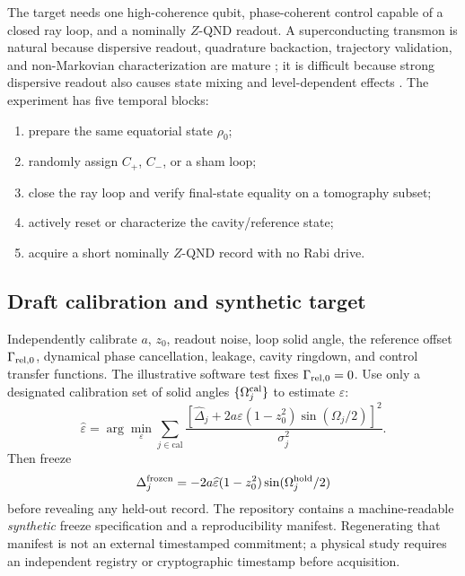 \documentclass[10pt]{article}
\theoremstyle{definition}
\theoremstyle{remark}
\begin{document}
The target needs one high-coherence qubit, phase-coherent control capable of a closed ray loop, and a nominally \(Z\)-QND readout. A superconducting transmon is natural because dispersive readout, quadrature backaction, trajectory validation, and non-Markovian characterization are mature \citep{Gambetta2008,Hatridge2013,Murch2013,White2022}; it is difficult because strong dispersive readout also causes state mixing and level-dependent effects \citep{Boissonneault2009}. The experiment has five temporal blocks:
\begin{enumerate}
\item prepare the same equatorial state \(\rho_0\);
\item randomly assign \(C_+\), \(C_-\), or a sham loop;
\item close the ray loop and verify final-state equality on a tomography subset;
\item actively reset or characterize the cavity/reference state;
\item acquire a short nominally \(Z\)-QND record with no Rabi drive.
\end{enumerate}

\subsection{Draft calibration and synthetic target}

Independently calibrate \(a\), \(z_0\), readout noise, loop solid angle, the reference offset \(\Gamma_{{\rm rel},0}\), dynamical phase cancellation, leakage, cavity ringdown, and control transfer functions. The illustrative software test fixes \(\Gamma_{{\rm rel},0}=0\). Use only a designated calibration set of solid angles \(\{\Omega_j^{\rm cal}\}\) to estimate \(\varepsilon\):
\begin{equation}
  \widehat\varepsilon
  =
  \arg\min_\varepsilon
  \sum_{j\in\mathrm{cal}}
  \frac{
  [\widehat\Delta_j+2a\varepsilon(1-z_0^2)\sin(\Omega_j/2)]^2
  }{\sigma_j^2}.
  \label{eq:epsilon-fit}
\end{equation}
Then freeze
\begin{equation}
  \Delta_j^{\rm frozen}
  =
  -2a\widehat\varepsilon(1-z_0^2)\sin(\Omega_j^{\rm hold}/2)
  \label{eq:frozen}
\end{equation}
before revealing any held-out record. The repository contains a machine-readable \emph{synthetic} freeze specification and a reproducibility manifest. Regenerating that manifest is not an external timestamped commitment; a physical study requires an independent registry or cryptographic timestamp before acquisition.
\end{document}
